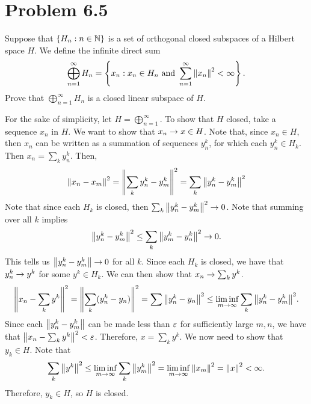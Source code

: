 \newpage
\section{Problem 6.5}
Suppose that $\{H_n : n \in \mathbb{N}\}$ is a set of orthogonal closed subspaces of a Hilbert space $H$. We define the infinite direct sum
\[\bigoplus_{n = 1}^\infty H_n = \left \{ x_n : x_n \in H_n \text{ and } \sum_{n=1}^\infty \norm{x_n}^2 < \infty\right\}.\]
Prove that $\bigoplus_{n = 1}^\infty H_n$ is a closed linear subspace of $H$.
\partbreak
\begin{solution}

    For the sake of simplicity, let $H = \bigoplus_{n =1}^\infty$. To show that $H$ closed, take a sequence $x_n$ in $H$. We want to show that $x_n \rightarrow x \in H$. Note that, since $x_n \in H$, then $x_n$ can be written as a summation of sequences $y^k_n$, for which each $y^k_n \in H_k$. Then $x_n = \sum_{k}y^k_n$. Then, 
    \[\norm{x_n - x_m}^2 = \norm{\sum_{k} y^k_n - y^k_m}^2 = \sum_{k} \norm{y^k_n - y^k_m}^2\]
    Note that since each $H_k$ is closed, then $\sum_{k} \norm{y^k_n - y^k_m}^2 \rightarrow 0$. Note that summing over all $k$ implies 
    \[\norm{y^k_n - y_m^k}^2 \leq \sum_k\norm{y^k_m - y^k_n}^2 \rightarrow 0.\]
    This tells us $\norm{y^k_n - y_m^k} \rightarrow 0$ for all $k$. Since each $H_k$ is closed, we have that $y_n^k \rightarrow y^k$ for some $y^k \in H_k$. We can then show that $x_n \rightarrow \sum_k y^k$.
    \[\norm{x_n - \sum_k y^k}^2 = \norm{\sum_k (y^k_n - y_n)}^2 = \sum\norm{y^k_n - y_n}^2 \leq \liminf_{m \rightarrow \infty} \sum_k \norm{y^k_n - y^k_m}^2.\]
    Since each $\norm{y^k_n - y^k_m}$ can be made less than $\varepsilon$ for sufficiently large $m, n$, we have that $\norm{x_n - \sum_k y^k}^2 < \varepsilon$. Therefore, $x = \sum_k y^k$. We now need to show that $y_k \in H$. Note that
    \[\sum_k\norm{y^k}^2 \leq \liminf_{m \rightarrow \infty}\sum_k\norm{y^k_m}^2 = \liminf_{m \rightarrow \infty} \norm{x_m}^2 = \norm{x}^2 < \infty.\]
    Therefore, $y_k \in H$, so $H$ is closed. 
\end{solution}


\newpage
